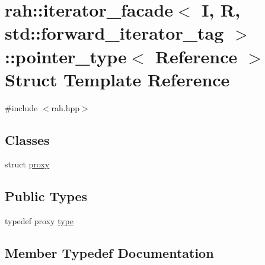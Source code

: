 \hypertarget{structrah_1_1iterator__facade_3_01_i_00_01_r_00_01std_1_1forward__iterator__tag_01_4_1_1pointer__type}{}\section{rah\+::iterator\+\_\+facade$<$ I, R, std\+::forward\+\_\+iterator\+\_\+tag $>$\+::pointer\+\_\+type$<$ Reference $>$ Struct Template Reference}
\label{structrah_1_1iterator__facade_3_01_i_00_01_r_00_01std_1_1forward__iterator__tag_01_4_1_1pointer__type}


{\ttfamily \#include $<$rah.\+hpp$>$}

\subsection*{Classes}
\begin{DoxyCompactItemize}
\item 
struct \mbox{\hyperlink{structrah_1_1iterator__facade_3_01_i_00_01_r_00_01std_1_1forward__iterator__tag_01_4_1_1pointer__type_1_1proxy}{proxy}}
\end{DoxyCompactItemize}
\subsection*{Public Types}
\begin{DoxyCompactItemize}
\item 
typedef proxy \mbox{\hyperlink{structrah_1_1iterator__facade_3_01_i_00_01_r_00_01std_1_1forward__iterator__tag_01_4_1_1pointer__type_a2289999abe125951a510673b21746a0d}{type}}
\end{DoxyCompactItemize}


\subsection{Member Typedef Documentation}
\mbox{\label{structrah_1_1iterator__facade_3_01_i_00_01_r_00_01std_1_1forward__iterator__tag_01_4_1_1pointer__type_a2289999abe125951a510673b21746a0d}} 
